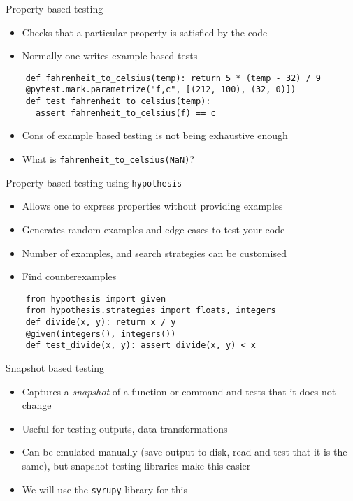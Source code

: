 \documentclass[11pt,xcolor={dvipsnames},hyperref={pdftex,pdfpagemode=UseNone,hidelinks,pdfdisplaydoctitle=true},usepdftitle=false]{beamer}
\begin{document}
\begin{frame}[fragile]{Property based testing}
\label{property-based-testing}
\begin{itemize}
\item
  Checks that a particular property is satisfied by the code
\item
  Normally one writes example based tests
\end{itemize}

\begin{verbatim}
    def fahrenheit_to_celsius(temp): return 5 * (temp - 32) / 9
    @pytest.mark.parametrize("f,c", [(212, 100), (32, 0)])
    def test_fahrenheit_to_celsius(temp):
      assert fahrenheit_to_celsius(f) == c
\end{verbatim}

\begin{itemize}
\item
  Cons of example based testing is not being exhaustive enough
\item
  What is \texttt{fahrenheit\_to\_celsius(NaN)}?
\end{itemize}
\end{frame}

\begin{frame}[fragile]{Property based testing using \texttt{hypothesis}}
\label{property-based-testing-using-hypothesis}
\begin{itemize}
\item
  Allows one to express properties without providing examples
\item
  Generates random examples and edge cases to test your code
\item
  Number of examples, and search strategies can be customised
\item
  Find counterexamples
\end{itemize}
\begin{verbatim}
    from hypothesis import given
    from hypothesis.strategies import floats, integers
    def divide(x, y): return x / y
    @given(integers(), integers())
    def test_divide(x, y): assert divide(x, y) < x
\end{verbatim}

\end{frame}


\begin{frame}{Snapshot based testing}
\label{snapshot-based-testing}
\begin{itemize}
\item
  Captures a \emph{snapshot} of a function or command and tests that it
  does not change
\item
  Useful for testing outputs, data transformations
\item
  Can be emulated manually (save output to disk, read and test that it
  is the same), but snapshot testing libraries make this easier
\item We will use the \texttt{syrupy} library for this
\end{itemize}
\end{frame}
\end{document}
